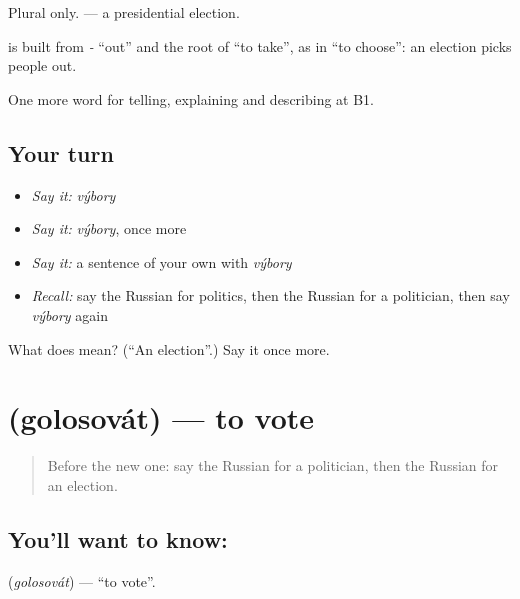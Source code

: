 Plural only. \emph{ } — a presidential election.

\begin{cousinweb}
\textbf{} is built from \emph{-} \textquotedblleft{}out\textquotedblright{} and the root of \emph{} \textquotedblleft{}to take\textquotedblright{}, as in \emph{} \textquotedblleft{}to choose\textquotedblright{}: an election picks people out.
\end{cousinweb}

\begin{grammarlens}[title={What you've built}]
One more word for telling, explaining and describing at B1.
\end{grammarlens}

\subsection*{Your turn}
\begin{itemize}
\raggedright
  \item \emph{Say it:} \emph{výbory}
  \item \emph{Say it:} \emph{výbory}, once more
  \item \emph{Say it:} a sentence of your own with \emph{výbory}
  \item \emph{Recall:} say the Russian for politics, then the Russian for a politician, then say \emph{výbory} again
\end{itemize}

\begin{tcolorbox}[breakable,colback=teal!4,colframe=teal!35!black,title={Before you move on}]
What does  mean? (\textquotedblleft{}An election\textquotedblright{}.) Say it once more.
\end{tcolorbox}
\section[\texorpdfstring{\ru{голосовать} (golosovát)}{голосовать (golosovát)}]{ (golosovát) — to vote}

\label{lesson:RU-C366-golosovat}



\begin{quote}
Before the new one: say the Russian for a politician, then the Russian for an election.
\end{quote}

\subsection*{You'll want to know: }
\textbf{} (\emph{golosovát}) — \textquotedblleft{}to vote\textquotedblright{}.


